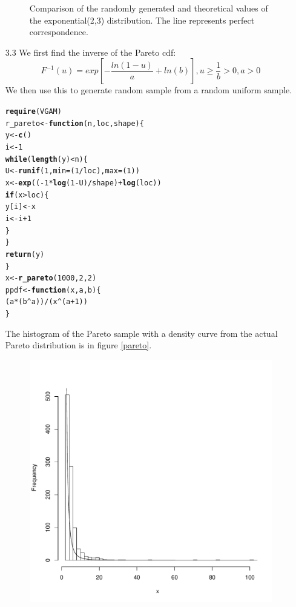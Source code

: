 \documentclass{article}\usepackage[]{graphicx}\usepackage[]{color}
\makeatletter
\def\maxwidth{ %
  \ifdim\Gin@nat@width>\linewidth
    \linewidth
  \else
    \Gin@nat@width
  \fi
}
\newcommand{\hlkwd}[1]{\textcolor[rgb]{0.737,0.353,0.396}{\textbf{#1}}}%
\newenvironment{kframe}{%
 \def\at@end@of@kframe{}%
 \ifinner\ifhmode%
  \def\at@end@of@kframe{\end{minipage}}%
  \begin{minipage}{\columnwidth}%
 \fi\fi%
 \def\FrameCommand##1{\hskip\@totalleftmargin \hskip-\fboxsep
 \colorbox{shadecolor}{##1}\hskip-\fboxsep
     \hskip-\linewidth \hskip-\@totalleftmargin \hskip\columnwidth}%
 \MakeFramed {\advance\hsize-\width
   \@totalleftmargin\z@ \linewidth\hsize
   \@setminipage}}%
 {\par\unskip\endMakeFramed%
 \at@end@of@kframe}
\newenvironment{knitrout}{}{} %
\makeatother
\begin{document}
\begin{itemize}
\begin{figure}
\begin{knitrout}
\end{knitrout}

\caption{Comparison of the randomly generated and theoretical values of the exponential(2,3) distribution. The line represents perfect correspondence.}
\label{exp}
\end{figure}
\clearpage
\item[3.3]We first find the inverse of the Pareto cdf:
$$F^{-1}(u)=exp\left[-\frac{ln(1-u)}{a}+ln(b)\right], u\geq\frac{1}{b}>0,a>0$$
We then use this to generate random sample from a random uniform sample.\\
\begin{knitrout}
\color{fgcolor}\begin{kframe}
\begin{alltt}
\hlkwd{require}(VGAM)
r_pareto <- \hlkwd{function}(n, loc, shape) \{
    y <- \hlkwd{c}()
    i <- 1
    \hlkwd{while} (\hlkwd{length}(y) < n) \{
        U <- \hlkwd{runif}(1, min = (1/loc), max = (1))
        x <- \hlkwd{exp}((-1 * \hlkwd{log}(1 - U)/shape) + \hlkwd{log}(loc))
        \hlkwd{if} (x > loc) \{
            y[i] <- x
            i <- i + 1
        \}
    \}
    \hlkwd{return}(y)
\}
x <- \hlkwd{r_pareto}(1000, 2, 2)
ppdf <- \hlkwd{function}(x, a, b) \{
    (a * (b^a))/(x^(a + 1))
\}
\end{alltt}
\end{kframe}
\end{knitrout}

The histogram of the Pareto sample with a density curve from the actual Pareto distribution is in figure \ref{pareto}.
\begin{figure}
\begin{knitrout}
\color{fgcolor}
\includegraphics[width=\maxwidth]{figure/plotPareto} 


\end{knitrout}
\end{figure}
\end{itemize}
\end{document}
